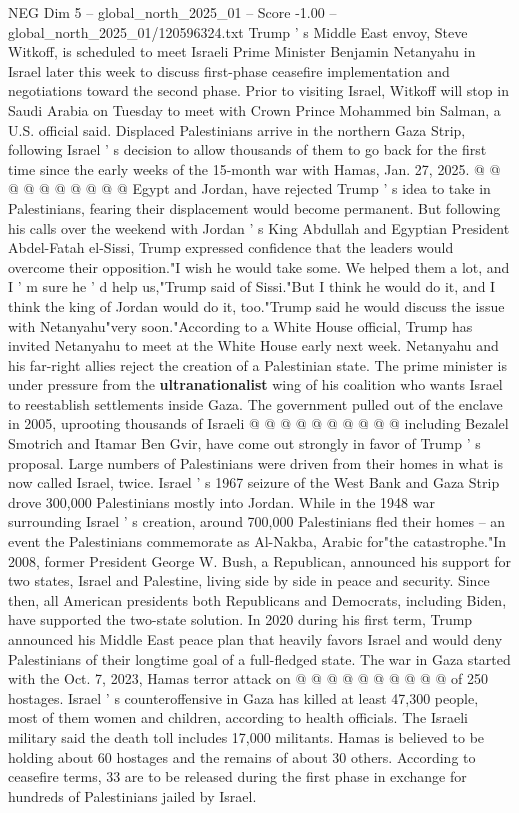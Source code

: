\begin{textsample}{NEG Dim 5 – global\_north\_2025\_01 – Score -1.00 – global\_north\_2025\_01/120596324.txt}
Trump ' s Middle East envoy, Steve Witkoff, is scheduled to meet Israeli Prime Minister Benjamin Netanyahu in Israel later this week to discuss first-phase ceasefire implementation and negotiations toward the second phase.
Prior to visiting Israel, Witkoff will stop in Saudi Arabia on Tuesday to meet with Crown Prince Mohammed bin Salman, a U.S. official said.
Displaced Palestinians arrive in the northern Gaza Strip, following Israel ' s decision to allow thousands of them to go back for the first time since the early weeks of the 15-month war with Hamas, Jan. 27, 2025. @ @ @ @ @ @ @ @ @ @ Egypt and Jordan, have rejected Trump ' s idea to take in Palestinians, fearing their displacement would become permanent.
But following his calls over the weekend with Jordan ' s King Abdullah and Egyptian President Abdel-Fatah el-Sissi, Trump expressed confidence that the leaders would overcome their opposition."I wish he would take some.
We helped them a lot, and I ' m sure he ' d help us,"Trump said of Sissi."But I think he would do it, and I think the king of Jordan would do it, too."Trump said he would discuss the issue with Netanyahu"very soon."According to a White House official, Trump has invited Netanyahu to meet at the White House early next week.
Netanyahu and his far-right allies reject the creation of a Palestinian state.
The prime minister is under pressure from the \textbf{ultranationalist} wing of his coalition who wants Israel to reestablish settlements inside Gaza.
The government pulled out of the enclave in 2005, uprooting thousands of Israeli @ @ @ @ @ @ @ @ @ @ including Bezalel Smotrich and Itamar Ben Gvir, have come out strongly in favor of Trump ' s proposal.
Large numbers of Palestinians were driven from their homes in what is now called Israel, twice.
Israel ' s 1967 seizure of the West Bank and Gaza Strip drove 300,000 Palestinians mostly into Jordan.
While in the 1948 war surrounding Israel ' s creation, around 700,000 Palestinians fled their homes -- an event the Palestinians commemorate as Al-Nakba, Arabic for"the catastrophe."In 2008, former President George W.
Bush, a Republican, announced his support for two states, Israel and Palestine, living side by side in peace and security.
Since then, all American presidents both Republicans and Democrats, including Biden, have supported the two-state solution.
In 2020 during his first term, Trump announced his Middle East peace plan that heavily favors Israel and would deny Palestinians of their longtime goal of a full-fledged state.
The war in Gaza started with the Oct. 7, 2023, Hamas terror attack on @ @ @ @ @ @ @ @ @ @ of 250 hostages.
Israel ' s counteroffensive in Gaza has killed at least 47,300 people, most of them women and children, according to health officials.
The Israeli military said the death toll includes 17,000 militants.
Hamas is believed to be holding about 60 hostages and the remains of about 30 others.
According to ceasefire terms, 33 are to be released during the first phase in exchange for hundreds of Palestinians jailed by Israel.

\end{textsample}
